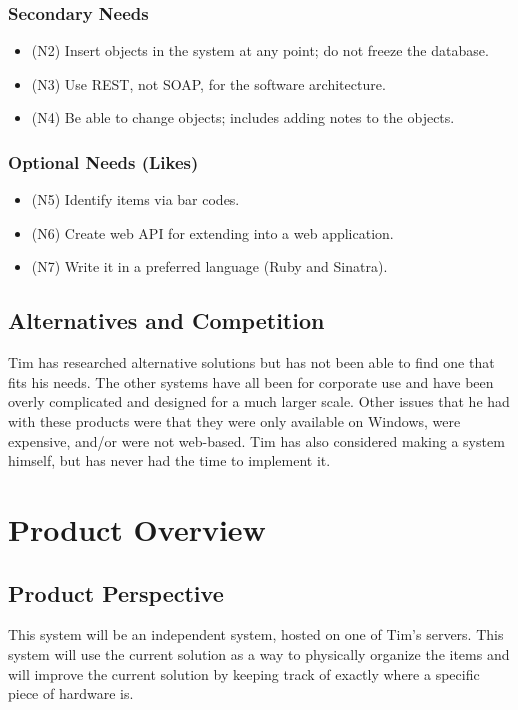 \documentclass{article}
\begin{document}
\subsubsection{Secondary Needs}
\begin{itemize}
\item (N2) Insert objects in the system at any point; do not freeze the database.
\item (N3) Use REST, not SOAP, for the software architecture.
\item (N4) Be able to change objects; includes adding notes to the objects.
\end{itemize}
\subsubsection{Optional Needs (Likes)}
\begin{itemize}
\item (N5) Identify items via bar codes.
\item (N6) Create web API for extending into a web application.
\item (N7) Write it in a preferred language (Ruby and Sinatra).
\end{itemize}


\subsection{Alternatives and Competition}
Tim has researched alternative solutions but has not been able to find one that fits his needs.  The other systems have all been for corporate use and have been overly complicated and designed for a much larger scale.  Other issues that he had with these products were that they were only available on Windows, were expensive, and/or were not web-based.  Tim has also considered making a system himself, but has never had the time to implement it.

\section{Product Overview}

\subsection{Product Perspective}
This system will be an independent system, hosted on one of Tim's servers.  This system will use the current solution as a way to physically organize the items and will improve the current solution by keeping track of exactly where a specific piece of hardware is.
\end{document}
